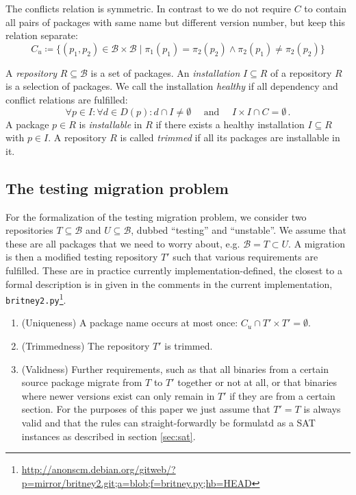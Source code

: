 \documentclass[halfparskip,11pt]{scrartcl}
\begin{document}
The conflicts relation is symmetric. In contrast to \cite{edos} we do not require $C$ to contain all pairs of packages with same name but different version number, but keep this relation separate:
\[
C_u \coloneqq \{(p_1,p_2) \in \mathcal B\times\mathcal B \mid \pi_1(p_1)=\pi_2(p_2) \wedge \pi_2(p_1) \ne \pi_2(p_2)\}
\]

A \emph{repository} $R\subseteq \mathcal B$ is a set of packages. An \emph{installation} $I\subseteq R$ of a repository $R$ is a selection of packages. We call the installation \emph{healthy} if all dependency and conflict relations are fulfilled: 
\[
\forall p\in I\colon  \forall d\in D(p)\colon d \cap I\ne\emptyset
\quad\text{ and }\quad
I \times I \cap C = \emptyset\,.
\]
A package $p\in R$ is \emph{installable} in $R$ if there exists a healthy installation $I\subseteq R$ with $p\in I$. A repository $R$ is called \emph{trimmed} if all its packages are installable in it.

\subsection{The testing migration problem}
\label{testmigdef}

For the formalization of the testing migration problem, we consider two repositories $T\subseteq\mathcal B$ and $U\subseteq\mathcal B$, dubbed “testing” and “unstable”. We assume that these are all packages that we need to worry about, e.g. $\mathcal B = T\subset U$. A migration is then a mo\-di\-fied testing repository $T'$ such that various requirements are fulfilled. These are in practice currently implementation-defined, the closest to a formal description is in given in the comments in the current implementation, \texttt{britney2.py}\footnote{\url{http://anonscm.debian.org/gitweb/?p=mirror/britney2.git;a=blob;f=britney.py;hb=HEAD}}.

\begin{enumerate}
\item (Uniqueness) A package name occurs at most once: $C_u \cap T'\times T' = \emptyset$.
\item (Trimmedness) The repository $T'$ is trimmed.
\item (Validness) Further requirements, such as that all binaries from a certain source package migrate from $T$ to $T'$ together or not at all, or that binaries where newer versions exist can only remain in $T'$ if they are from a certain section. For the purposes of this paper we just assume that $T'=T$ is always valid and that the rules can straight-forwardly be formulatd as a SAT instances as described in section \ref{sec:sat}.
\end{enumerate}
\end{document}
